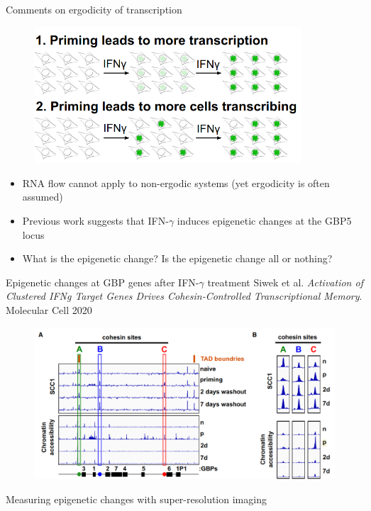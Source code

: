 \documentclass[aspectratio=1610]{beamer}					%
\begin{document}
\begin{frame}{Comments on ergodicity of transcription}
\begin{figure}
\includegraphics[width=10cm]{Ergodic.png}
\end{figure}
\begin{itemize}
\item RNA flow cannot apply to non-ergodic systems (yet ergodicity is often assumed)
\item Previous work suggests that IFN-$\gamma$ induces epigenetic changes at the GBP5 locus
\item What is the epigenetic change? Is the epigenetic change all or nothing?
\end{itemize}
\vspace{0.1in}


\end{frame}

\begin{frame}{Epigenetic changes at GBP genes after IFN-$\gamma$ treatment}
Siwek et al. \textit{Activation of Clustered IFNg Target Genes Drives Cohesin-Controlled Transcriptional Memory}. Molecular Cell 2020
\begin{figure}
\includegraphics[width=12cm]{Epigenetic.png}
\end{figure}
\end{frame}

\begin{frame}{Measuring epigenetic changes with super-resolution imaging}

\end{frame}
\end{document}
